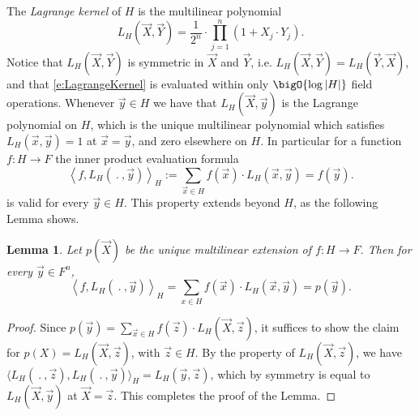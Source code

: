 \documentclass[11pt]{article}
\newtheorem{lem}[]{Lemma}
\theoremstyle{definition}
\theoremstyle{definition}
\begin{document}
The \textit{Lagrange kernel} of $H$ is the multilinear polynomial
\begin{equation}
\label{e:LagrangeKernel}
L_H(\vec X, \vec Y)  = \frac{1}{2^n}\cdot \prod_{j=1}^n (1 + X_j\cdot Y_j).
\end{equation}
Notice that $L_H(\vec X, \vec Y)$ is symmetric in $\vec X$ and $\vec Y$, i.e. $L_H(\vec X, \vec Y)=L_H(\vec Y, \vec X)$, and that \eqref{e:LagrangeKernel} is evaluated within only $\bigO{\log|H|}$ field operations.
Whenever $\vec y \in H$ we have that $L_H(\vec X, \vec y)$ is the Lagrange polynomial on $H$, which is the unique multilinear polynomial which satisfies $L_H(\vec x, \vec y) = 1$ at $\vec x = \vec y$, and zero elsewhere on $H$.
In particular for a function $f: H\rightarrow F$  the inner product evaluation formula 
\[
\left\langle f ,L_H(\:.\:, \vec y)\right\rangle_H := \sum_{\vec x\in H} f(\vec x) \cdot L_H(\vec x, \vec y) = f(\vec y).
\]
is valid for every $\vec y\in H$.
This property extends beyond $H$, as the following Lemma shows.
\begin{lem}
\label{lem:Lagrange}
Let $p(\vec X)$ be the unique multilinear extension of $f: H\rightarrow F$. 
Then for every $\vec y\in F^n$,
\begin{equation}
\label{e:LagrangeScalarProduct}
\left\langle f ,L_H(\:.\:, \vec y)\right\rangle_H = \sum_{x\in H} f(\vec x) \cdot L_H(\vec x, \vec y) = p(\vec y).
\end{equation}
\end{lem}
\begin{proof}
Since $p(\vec y) = \sum_{\vec x\in H} f(\vec z)\cdot L_H(\vec X,\vec z)$, it suffices to show the claim for $p(X) = L_H(\vec X,\vec z)$, with $\vec z\in H$.
By the property of $L_H(\vec X,\vec z)$, we have $\big\langle L_H(\:.\:, \vec z), L_H(\:.\:,\vec y) \big\rangle_H =L_H(\vec y,\vec z)$, which by symmetry is equal to $L_H(\vec X,\vec y)$ at $\vec X=\vec z$.
This completes the proof of the Lemma.
\end{proof}
\end{document}
